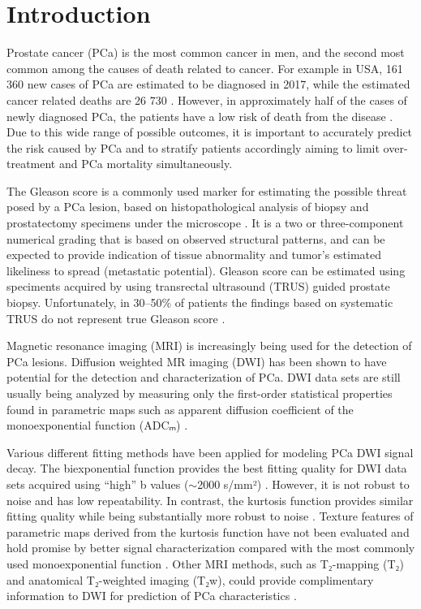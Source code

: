 \section{Introduction}

Prostate cancer (PCa) is the most common cancer in men, and the second most
common among the causes of death related to cancer. For example in USA, 161 360
new cases of PCa are estimated to be diagnosed in 2017, while the estimated
cancer related deaths are 26 730 \citep{Siegel2017}. However, in approximately
half of the cases of newly diagnosed PCa, the patients have a low risk of death
from the disease \citep{Walsh2007, Draisma2003}. Due to this wide range of
possible outcomes, it is important to accurately predict the risk caused by
PCa and to stratify patients accordingly aiming to limit over-treatment and
PCa mortality simultaneously.

The Gleason score is a commonly used marker for estimating the possible threat
posed by a PCa lesion, based on histopathological analysis of biopsy and
prostatectomy specimens under the microscope \citep{Epstein2005}. It is a two or
three-component numerical grading that is based on observed structural patterns,
and can be expected to provide indication of tissue abnormality and tumor's
estimated likeliness to spread (metastatic potential). Gleason score can be
estimated using speciments acquired by using transrectal ultrasound (TRUS)
guided prostate biopsy. Unfortunately, in 30--50\% of patients the findings
based on systematic TRUS do not represent true Gleason score \citep{Nepple2009,
Steinberg1997, Rajinikanth2008}.

Magnetic resonance imaging (MRI) is increasingly being used for the detection of
PCa lesions. Diffusion weighted MR imaging (DWI) has been shown to have
potential for the detection and characterization of PCa. DWI data sets are
still usually being analyzed by measuring only the first-order statistical
properties found in parametric maps such as apparent diffusion coefficient of
the monoexponential function (ADCₘ) \citep{Turkbey2011, Toivonen2015,
Jambor2015Relaxation}.

Various different fitting methods have been applied for modeling PCa DWI signal
decay. The biexponential function \citep{Mulkern2006} provides the best fitting
quality for DWI data sets acquired using ``high'' b values ($\sim$2000 s/mm²)
\citep{Jambor2015Evaluation}. However, it is not robust to noise and has low
repeatability. In contrast, the kurtosis function \citep{Jensen2005} provides
similar fitting quality while being substantially more robust to noise
\citep{Jambor2015Evaluation}. Texture features of parametric maps derived from
the kurtosis function have not been evaluated and hold promise by better signal
characterization compared with the most commonly used monoexponential function
\citep{Toivonen2015}. Other MRI methods, such as T₂-mapping (T₂) and anatomical
T₂-weighted imaging (T₂w), could provide complimentary information to DWI for
prediction of PCa characteristics \citep{Jambor2015Relaxation}.

